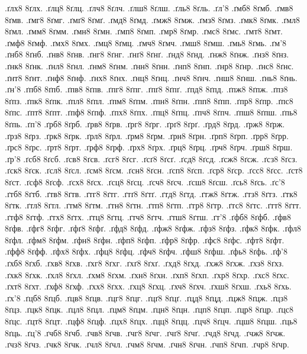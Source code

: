{.ґлх8
8ґлх.
.ґлц8
8ґлц.
.ґлч8
8ґлч.
.ґлш8
8ґлш.
.ґль8
8ґль.
.ґл'8
.ґмб8
8ґмб.
.ґмв8
8ґмв.
.ґмг8
8ґмг.
.ґмґ8
8ґмґ.
.ґмд8
8ґмд.
.ґмж8
8ґмж.
.ґмз8
8ґмз.
.ґмк8
8ґмк.
.ґмл8
8ґмл.
.ґмм8
8ґмм.
.ґмн8
8ґмн.
.ґмп8
8ґмп.
.ґмр8
8ґмр.
.ґмс8
8ґмс.
.ґмт8
8ґмт.
.ґмф8
8ґмф.
.ґмх8
8ґмх.
.ґмц8
8ґмц.
.ґмч8
8ґмч.
.ґмш8
8ґмш.
.ґмь8
8ґмь.
.ґм'8
.ґнб8
8ґнб.
.ґнв8
8ґнв.
.ґнг8
8ґнг.
.ґнґ8
8ґнґ.
.ґнд8
8ґнд.
.ґнж8
8ґнж.
.ґнз8
8ґнз.
.ґнк8
8ґнк.
.ґнл8
8ґнл.
.ґнм8
8ґнм.
.ґнн8
8ґнн.
.ґнп8
8ґнп.
.ґнр8
8ґнр.
.ґнс8
8ґнс.
.ґнт8
8ґнт.
.ґнф8
8ґнф.
.ґнх8
8ґнх.
.ґнц8
8ґнц.
.ґнч8
8ґнч.
.ґнш8
8ґнш.
.ґнь8
8ґнь.
.ґн'8
.ґпб8
8ґпб.
.ґпв8
8ґпв.
.ґпг8
8ґпг.
.ґпґ8
8ґпґ.
.ґпд8
8ґпд.
.ґпж8
8ґпж.
.ґпз8
8ґпз.
.ґпк8
8ґпк.
.ґпл8
8ґпл.
.ґпм8
8ґпм.
.ґпн8
8ґпн.
.ґпп8
8ґпп.
.ґпр8
8ґпр.
.ґпс8
8ґпс.
.ґпт8
8ґпт.
.ґпф8
8ґпф.
.ґпх8
8ґпх.
.ґпц8
8ґпц.
.ґпч8
8ґпч.
.ґпш8
8ґпш.
.ґпь8
8ґпь.
.ґп'8
.ґрб8
8ґрб.
.ґрв8
8ґрв.
.ґрг8
8ґрг.
.ґрґ8
8ґрґ.
.ґрд8
8ґрд.
.ґрж8
8ґрж.
.ґрз8
8ґрз.
.ґрк8
8ґрк.
.ґрл8
8ґрл.
.ґрм8
8ґрм.
.ґрн8
8ґрн.
.ґрп8
8ґрп.
.ґрр8
8ґрр.
.ґрс8
8ґрс.
.ґрт8
8ґрт.
.ґрф8
8ґрф.
.ґрх8
8ґрх.
.ґрц8
8ґрц.
.ґрч8
8ґрч.
.ґрш8
8ґрш.
.ґр'8
.ґсб8
8ґсб.
.ґсв8
8ґсв.
.ґсг8
8ґсг.
.ґсґ8
8ґсґ.
.ґсд8
8ґсд.
.ґсж8
8ґсж.
.ґсз8
8ґсз.
.ґск8
8ґск.
.ґсл8
8ґсл.
.ґсм8
8ґсм.
.ґсн8
8ґсн.
.ґсп8
8ґсп.
.ґср8
8ґср.
.ґсс8
8ґсс.
.ґст8
8ґст.
.ґсф8
8ґсф.
.ґсх8
8ґсх.
.ґсц8
8ґсц.
.ґсч8
8ґсч.
.ґсш8
8ґсш.
.ґсь8
8ґсь.
.ґс'8
.ґтб8
8ґтб.
.ґтв8
8ґтв.
.ґтг8
8ґтг.
.ґтґ8
8ґтґ.
.ґтд8
8ґтд.
.ґтж8
8ґтж.
.ґтз8
8ґтз.
.ґтк8
8ґтк.
.ґтл8
8ґтл.
.ґтм8
8ґтм.
.ґтн8
8ґтн.
.ґтп8
8ґтп.
.ґтр8
8ґтр.
.ґтс8
8ґтс.
.ґтт8
8ґтт.
.ґтф8
8ґтф.
.ґтх8
8ґтх.
.ґтц8
8ґтц.
.ґтч8
8ґтч.
.ґтш8
8ґтш.
.ґт'8
.ґфб8
8ґфб.
.ґфв8
8ґфв.
.ґфг8
8ґфг.
.ґфґ8
8ґфґ.
.ґфд8
8ґфд.
.ґфж8
8ґфж.
.ґфз8
8ґфз.
.ґфк8
8ґфк.
.ґфл8
8ґфл.
.ґфм8
8ґфм.
.ґфн8
8ґфн.
.ґфп8
8ґфп.
.ґфр8
8ґфр.
.ґфс8
8ґфс.
.ґфт8
8ґфт.
.ґфф8
8ґфф.
.ґфх8
8ґфх.
.ґфц8
8ґфц.
.ґфч8
8ґфч.
.ґфш8
8ґфш.
.ґфь8
8ґфь.
.ґф'8
.ґхб8
8ґхб.
.ґхв8
8ґхв.
.ґхг8
8ґхг.
.ґхґ8
8ґхґ.
.ґхд8
8ґхд.
.ґхж8
8ґхж.
.ґхз8
8ґхз.
.ґхк8
8ґхк.
.ґхл8
8ґхл.
.ґхм8
8ґхм.
.ґхн8
8ґхн.
.ґхп8
8ґхп.
.ґхр8
8ґхр.
.ґхс8
8ґхс.
.ґхт8
8ґхт.
.ґхф8
8ґхф.
.ґхх8
8ґхх.
.ґхц8
8ґхц.
.ґхч8
8ґхч.
.ґхш8
8ґхш.
.ґхь8
8ґхь.
.ґх'8
.ґцб8
8ґцб.
.ґцв8
8ґцв.
.ґцг8
8ґцг.
.ґцґ8
8ґцґ.
.ґцд8
8ґцд.
.ґцж8
8ґцж.
.ґцз8
8ґцз.
.ґцк8
8ґцк.
.ґцл8
8ґцл.
.ґцм8
8ґцм.
.ґцн8
8ґцн.
.ґцп8
8ґцп.
.ґцр8
8ґцр.
.ґцс8
8ґцс.
.ґцт8
8ґцт.
.ґцф8
8ґцф.
.ґцх8
8ґцх.
.ґцц8
8ґцц.
.ґцч8
8ґцч.
.ґцш8
8ґцш.
.ґць8
8ґць.
.ґц'8
.ґчб8
8ґчб.
.ґчв8
8ґчв.
.ґчг8
8ґчг.
.ґчґ8
8ґчґ.
.ґчд8
8ґчд.
.ґчж8
8ґчж.
.ґчз8
8ґчз.
.ґчк8
8ґчк.
.ґчл8
8ґчл.
.ґчм8
8ґчм.
.ґчн8
8ґчн.
.ґчп8
8ґчп.
.ґчр8
8ґчр.
}
